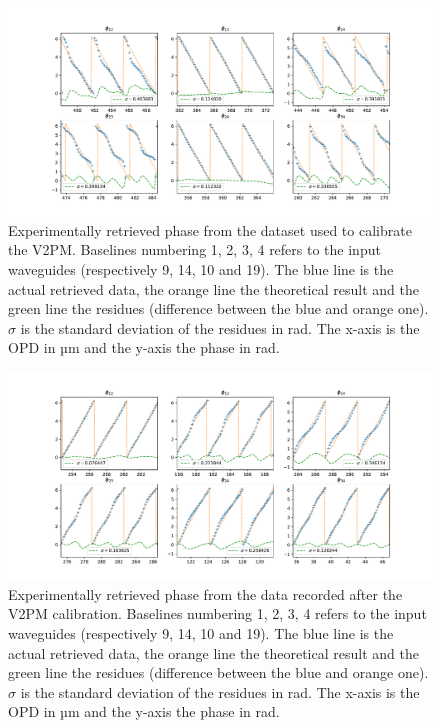 \begin{figure}[htbp!]
 \centering
 \includegraphics[scale=.4]{../picture/retrieve_phase_expe1.pdf}
 \caption{Experimentally retrieved phase from the dataset used to calibrate the V2PM. Baselines numbering 1, 2, 3, 4 refers to the input waveguides (respectively  9, 14, 10 and 19). The blue line is the actual retrieved data, the orange line the theoretical result and the green line the residues (difference between the blue and orange one). $\sigma$ is the standard deviation of the residues in rad. The x-axis is the OPD in µm and the y-axis the phase in rad. }
 \label{fig:retrieved_phase_expe}
\end{figure}

\begin{figure}[htbp!]
 \centering
 \includegraphics[scale=.4]{../picture/retrieve_phase_expe2.pdf}
 \caption{Experimentally retrieved phase from the data recorded after the V2PM calibration. Baselines numbering 1, 2, 3, 4 refers to the input waveguides (respectively  9, 14, 10 and 19). The blue line is the actual retrieved data, the orange line the theoretical result and the green line the residues (difference between the blue and orange one). $\sigma$ is the standard deviation of the residues in rad. The x-axis is the OPD in µm and the y-axis the phase in rad. }
 \label{fig:retrieved_phase_expe2}
\end{figure}

